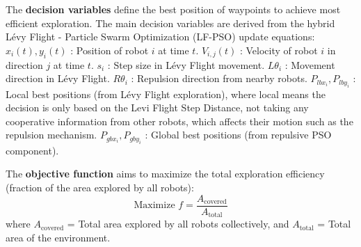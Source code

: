 The \textbf{decision variables} define the best position of waypoints to achieve most efficient exploration. The main decision variables are derived from the hybrid Lévy Flight - Particle Swarm Optimization (LF-PSO) update equations:
$x_i(t), y_i(t)$ : Position of robot $i$ at time $t$.
$V_{i,j}(t)$ : Velocity of robot $i$ in direction $j$ at time $t$.
$s_i$ : Step size in Lévy Flight movement.
$L\theta_i$ : Movement direction in Lévy Flight.
$R\theta_i$ : Repulsion direction from nearby robots.
$P_{lbx_i}, P_{lby_i}$ : Local best positions (from Lévy Flight exploration), where local means the decision is only based on the Levi Flight Step Distance, not taking any cooperative information from other robots, which affects their motion such as the repulsion mechanism.
$P_{gbx_i}, P_{gby_i}$ : Global best positions (from repulsive PSO component).

The \textbf{objective function} aims to maximize the total exploration efficiency (fraction of the area explored by all robots):
\begin{equation}
\text{Maximize } f = \frac{A_{\text{covered}}}{A_{\text{total}}}
\end{equation}
where $A_{\text{covered}}$ = Total area explored by all robots collectively, and $A_{\text{total}}$ = Total area of the environment.

